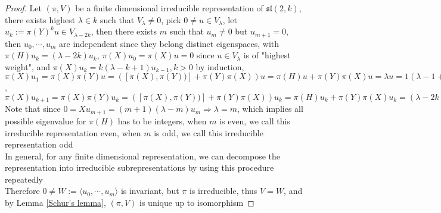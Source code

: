\documentclass[main]{subfiles}
\begin{document}
\begin{proof}
Let $(\pi,V)$ be a finite dimensional irreducible representation of $\mathfrak{sl}(2,k)$, there exists highest $\lambda\in k$ such that $V_\lambda\neq0$, pick $0\neq u\in V_\lambda$, let $u_k:=\pi(Y)^ku\in V_{\lambda-2k}$, then there exists $m$ such that $u_m\neq0$ but $u_{m+1}=0$, then $u_0,\cdots,u_m$ are independent since they belong distinct eigenspaces, with $\pi(H)u_k=(\lambda-2k)u_k$, $\pi(X)u_0=\pi(X)u=0$ since $u\in V_\lambda$ is of "highest weight", and $\pi(X)u_k=k(\lambda-k+1)u_{k-1},k>0$ by induction, $\pi(X)u_1=\pi(X)\pi(Y)u=([\pi(X),\pi(Y))]+\pi(Y)\pi(X))u=\pi(H)u+\pi(Y)\pi(X)u=\lambda u=1(\lambda-1+1) u_0$,
$\pi(X)u_{k+1}=\pi(X)\pi(Y)u_k=([\pi(X),\pi(Y))]+\pi(Y)\pi(X))u_k=\pi(H)u_k+\pi(Y)\pi(X)u_k=(\lambda-2k)u_k+k(\lambda-k+1)\pi(Y)u_{k-1}=(k+1)(\lambda-k)u_k$ \\
Note that since $0=Xu_{m+1}=(m+1)(\lambda-m)u_m\Rightarrow\lambda=m$, which implies all possible eigenvalue for $\pi(H)$ has to be integers, when $m$ is even, we call this irreducible representation even, when $m$ is odd, we call this irreducible representation odd \\
In general, for any finite dimensional representation, we can decompose the representation into irreducible subrepresentations by using this procedure repeatedly \\
Therefore $0\neq W:=\langle u_0,\cdots,u_m\rangle$ is invariant, but $\pi$ is irreducible, thus $V=W$, and by Lemma \ref{Schur's lemma}, $(\pi,V)$ is unique up to isomorphism
\end{proof}
\end{document}
